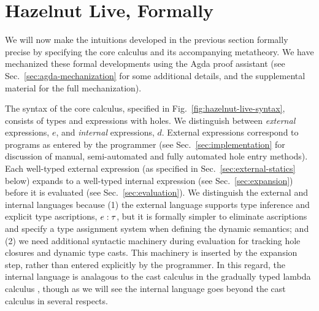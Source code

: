 
\clearpage
\newcommand{\calculusSec}{Hazelnut Live, Formally}
\section{\protect\calculusSec}
\label{sec:calculus}

We will now make the intuitions developed in the previous section formally precise by specifying the \HazelnutLive core calculus and  its accompanying metatheory. We have mechanized these formal developments using the Agda proof assistant \cite{norell:thesis,norell2009dependently} (see Sec.~\ref{sec:agda-mechanization} for some additional details, and the supplemental material for the full mechanization). %

The syntax of the core calculus, specified in Fig.~\ref{fig:hazelnut-live-syntax}, consists of types and expressions with holes. We distinguish between \emph{external} expressions, $e$, and \emph{internal} expressions, $d$. External expressions correspond to programs as entered by the programmer (see Sec.~\ref{sec:implementation} for discussion of manual, semi-automated and fully automated hole entry methods). Each well-typed external expression (as specified in Sec.~\ref{sec:external-statics} below) expands to a well-typed internal expression (see Sec.~\ref{sec:expansion}) before it is evaluated (see Sec.~\ref{sec:evaluation}). We distinguish the external and internal languages because (1) the external language supports type inference and explicit type ascriptions, $e : \tau$, but it is  formally simpler to eliminate ascriptions and specify a type assignment system when defining the dynamic semantics; and (2) we need additional syntactic machinery during evaluation for tracking hole closures and dynamic type casts. This machinery is inserted by the expansion step, rather than entered explicitly by the programmer. In this regard, the internal language is analagous to the cast calculus in the gradually typed lambda calculus \cite{DBLP:conf/snapl/SiekVCB15,Siek06a}, though as we will see the \HazelnutLive internal language goes beyond the cast calculus in several respects.





